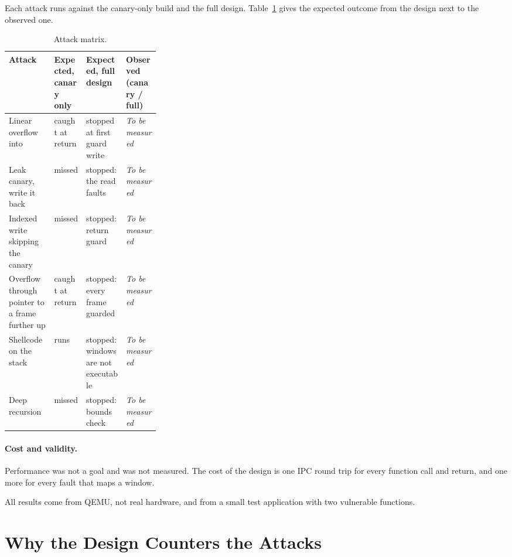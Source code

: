 \documentclass[10pt,a4paper]{article}
\newif\ifdraft
\newcommand{\draftnote}[1]{\ifdraft\par\smallskip\noindent
  {\small\color{gray}\textit{Draft prompt: #1}}\par\smallskip\fi}
\newcommand{\code}[1]{\texttt{\detokenize{#1}}}
\newcommand{\resultplaceholder}{\textit{To be measured}}
\begin{document}
Each attack runs against the canary-only build and the full design.
Table~\ref{tab:matrix} gives the expected outcome from the design next to
the observed one.

\begin{table}[htbp]
\centering
\small
\begin{tabularx}{\linewidth}{@{}p{0.30\linewidth}XXX@{}}
\toprule
Attack & Expected, canary only & Expected, full design & Observed (canary / full) \\
\midrule
Linear overflow into \code{ra} & caught at return & stopped at first guard write & \resultplaceholder \\
Leak canary, write it back & missed & stopped: the read faults & \resultplaceholder \\
Indexed write skipping the canary & missed & stopped: return guard & \resultplaceholder \\
Overflow through pointer to a frame further up & caught at return & stopped: every frame guarded & \resultplaceholder \\
Shellcode on the stack & runs & stopped: windows are not executable & \resultplaceholder \\
Deep recursion & missed & stopped: bounds check & \resultplaceholder \\
\bottomrule
\end{tabularx}
\caption{Attack matrix.}
\label{tab:matrix}
\end{table}

\draftnote{Run each row and fill in the last column with the monitor's log
line or the canary diagnostic. Separate observed results from expectations
in the discussion below the table.}

\paragraph{Cost and validity.}
Performance was not a goal and was not measured. The cost of the design is
one IPC round trip for every function call and return, and one more for every
fault that maps a window.
\draftnote{Optionally report faults per call for \code{greet}.}
All results come from QEMU, not real hardware, and from a small test
application with two vulnerable functions.

\section{Why the Design Counters the Attacks}
\label{sec:why}
\end{document}
